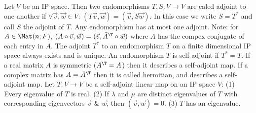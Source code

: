 Let $V$ be an IP space. Then two endomorphisms $T, S : V \to V$ are caled adjoint to one another if $\forall \vec{v}, \vec{w} \in V$: $(T\vec{v}, \vec{w}) = (\vec{v}, S\vec{w})$. In this case we write $S = T^{*}$ and call $S$ the adjoint of $T$.
Any endomorphism has at most one adjoint.
Note: for $A \in \Mat(n; F)$, $(A \circ \vec{v}, \vec{w}) = (\vec{v}, \bar{A}^{\T} \circ \vec{w})$ where $\bar{A}$ has the compex conjugate of each entry in $A$.
 The adjoint $T^{*}$ to an endomorphism $T$ on a finite dimensional IP space always exists and is unique.
 An endomorphism $T$ is self-adjoint if $T^{*} = T$.
If a real matrix $A$ is symmetric ($A^{\T} = A$) then it describes a self-adjoint map. If a complex matrix has $A = \bar{A}^{\T}$ then it is called hermitian, and describes a self-adjoint map.
 Let $T : V \to V$ be a self-adjoint linear map on an IP space $V$:
(1) Every eigenvalue of $T$ is real.
(2) If $\lambda$ and $\mu$ are distinct eigenvalues of $T$ with corresponding eigenvectors $\vec{v}$ \& $\vec{w}$, then $(\vec{v}, \vec{w}) = 0$.
(3) $T$ has an eigenvalue.
